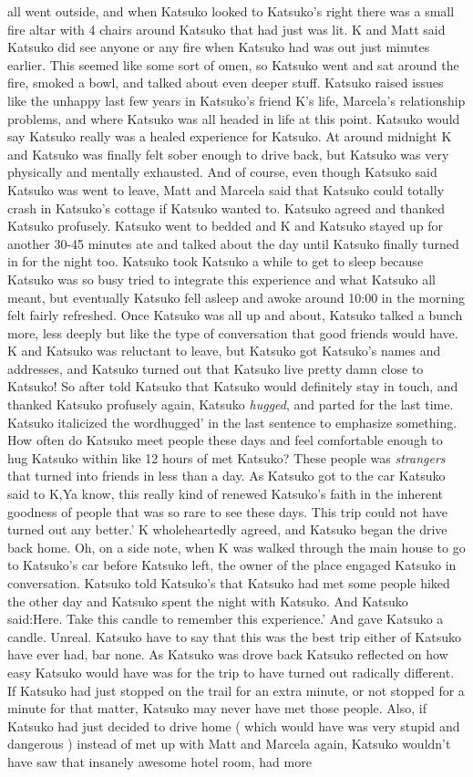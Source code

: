\documentclass[12pt]{book}
\begin{document}
all went outside, and when Katsuko looked to Katsuko's right there was a small fire altar with 4 chairs around Katsuko that had just was lit. K and Matt said Katsuko did see anyone or any fire when Katsuko had was out just minutes earlier. This seemed like some sort of omen, so Katsuko went and sat around the fire, smoked a bowl, and talked about even deeper stuff. Katsuko raised issues like the unhappy last few years in Katsuko's friend K's life, Marcela's relationship problems, and where Katsuko was all headed in life at this point. Katsuko would say Katsuko really was a healed experience for Katsuko. At around midnight K and Katsuko was finally felt sober enough to drive back, but Katsuko was very physically and mentally exhausted. And of course, even though Katsuko said Katsuko was went to leave, Matt and Marcela said that Katsuko could totally crash in Katsuko's cottage if Katsuko wanted to. Katsuko agreed and thanked Katsuko profusely. Katsuko went to bedded and K and Katsuko stayed up for another 30-45 minutes ate and talked about the day until Katsuko finally turned in for the night too. Katsuko took Katsuko a while to get to sleep because Katsuko was so busy tried to integrate this experience and what Katsuko all meant, but eventually Katsuko fell asleep and awoke around 10:00 in the morning felt fairly refreshed. Once Katsuko was all up and about, Katsuko talked a bunch more, less deeply but like the type of conversation that good friends would have. K and Katsuko was reluctant to leave, but Katsuko got Katsuko's names and addresses, and Katsuko turned out that Katsuko live pretty damn close to Katsuko! So after told Katsuko that Katsuko would definitely stay in touch, and thanked Katsuko profusely again, Katsuko \emph{hugged}, and parted for the last time. Katsuko italicized the wordhugged' in the last sentence to emphasize something. How often do Katsuko meet people these days and feel comfortable enough to hug Katsuko within like 12 hours of met Katsuko? These people was \emph{strangers} that turned into friends in less than a day. As Katsuko got to the car Katsuko said to K,Ya know, this really kind of renewed Katsuko's faith in the inherent goodness of people that was so rare to see these days. This trip could not have turned out any better.' K wholeheartedly agreed, and Katsuko began the drive back home. Oh, on a side note, when K was walked through the main house to go to Katsuko's car before Katsuko left, the owner of the place engaged Katsuko in conversation. Katsuko told Katsuko's that Katsuko had met some people hiked the other day and Katsuko spent the night with Katsuko. And Katsuko said:Here. Take this candle to remember this experience.' And gave Katsuko a candle. Unreal. Katsuko have to say that this was the best trip either of Katsuko have ever had, bar none. As Katsuko was drove back Katsuko reflected on how easy Katsuko would have was for the trip to have turned out radically different. If Katsuko had just stopped on the trail for an extra minute, or not stopped for a minute for that matter, Katsuko may never have met those people. Also, if Katsuko had just decided to drive home ( which would have was very stupid and dangerous ) instead of met up with Matt and Marcela again, Katsuko wouldn't have saw that insanely awesome hotel room, had more 
\end{document}
